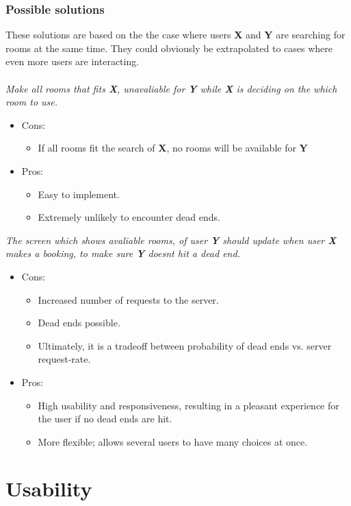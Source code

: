 \subsubsection*{Possible solutions}
These solutions are based on the the case where users \textbf{X} and \textbf{Y} are searching for rooms at the same time. They could obviously be extrapolated to cases where even more users are interacting. \\ \\
\emph{Make all rooms that fits \textbf{X}, unavaliable for \textbf{Y} while \textbf{X} is deciding on the which room to use.}
	\begin{itemize}
	\item Cons:
		\begin{itemize}
		\item If all rooms fit the search of \textbf{X}, no rooms will be available for \textbf{Y} 
		\end{itemize}
	\item Pros:
		\begin{itemize}
		\item Easy to implement.
		\item Extremely unlikely to encounter dead ends.
		\end{itemize}
	\end{itemize}
\emph{The screen which shows avaliable rooms, of user \textbf{Y} should update when user \textbf{X} makes a booking, to make sure \textbf{Y} doesnt hit a dead end.}
	\begin{itemize}
	\item Cons:
		\begin{itemize}
		\item Increased number of requests to the server.
		\item Dead ends possible.
		\item Ultimately, it is a tradeoff between probability of dead ends vs. server request-rate.
		\end{itemize}
	\item Pros:
		\begin{itemize}
		\item High usability and responsiveness, resulting in a pleasant experience for the user if no dead ends are hit. 
		\item More flexible; allows several users to have many choices at once.
		\end{itemize}
	\end{itemize}

\section{Usability}
\label{sec:usability}
\\


